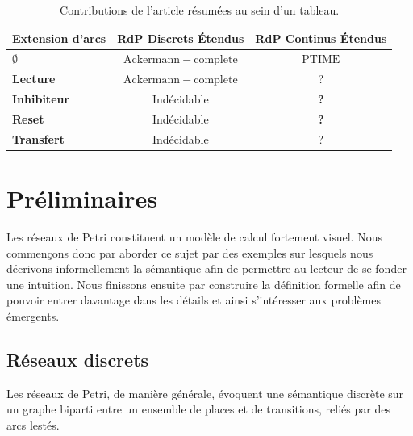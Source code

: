 \documentclass{article}
\theoremstyle{remark}
\theoremstyle{remark}
\begin{document}
\begin{table}[ht]
    \centering
    \setlength{\tabcolsep}{18pt}
    \setlength{\arrayrulewidth}{0.5mm}
    \renewcommand{\arraystretch}{1.75}
    \begin{tabular}{|l|c|c|}
        \hline
        \textbf{Extension d'arcs} & \textbf{RdP Discrets Étendus} & \textbf{RdP Continus Étendus}\\
        \hline
        $\boldsymbol{\emptyset}$ & $\mathrm{Ackermann-complete}$ & $\mathrm{PTIME}$                    \\
        \textbf{Lecture}         & $\mathrm{Ackermann-complete}$ & ?                                   \\
        \textbf{Inhibiteur}      & Indécidable                   & \cellcolor[HTML]{FFAAAA} \textbf{?} \\
        \textbf{Reset}           & Indécidable                   & \cellcolor[HTML]{FF8888} \textbf{?} \\
        \textbf{Transfert}       & Indécidable                   & ?                                   \\
        \hline
    \end{tabular}
    \caption{Contributions de l'article résumées au sein d'un tableau.}
    \label{tab:contributions}
\end{table}

\newpage

\section{Préliminaires}

Les réseaux de Petri constituent un modèle de calcul fortement visuel. Nous commençons donc par aborder ce sujet par des exemples sur lesquels nous décrivons informellement la sémantique afin de permettre au lecteur de se fonder une intuition. Nous finissons ensuite par construire la définition formelle afin de pouvoir entrer davantage dans les détails et ainsi s'intéresser aux problèmes émergents.

\subsection{Réseaux discrets}

Les réseaux de Petri, de manière générale, évoquent une sémantique discrète sur un graphe biparti entre un ensemble de places et de transitions, reliés par des arcs lestés.
\end{document}
